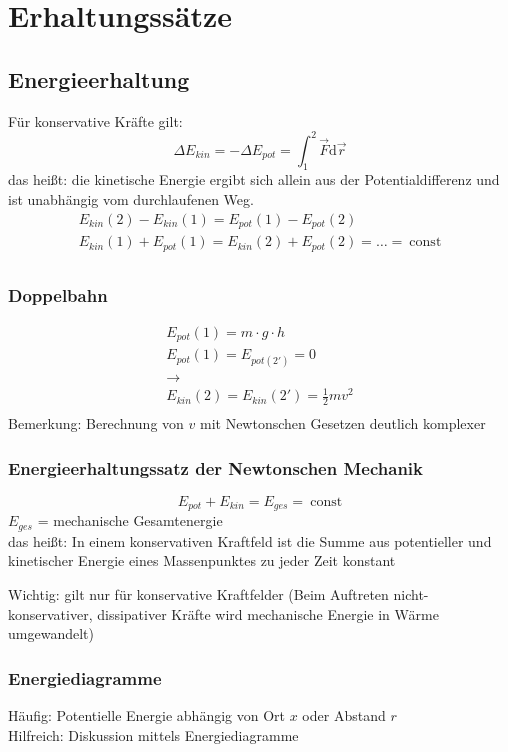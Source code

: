 \documentclass[a4paper]{scrartcl}
\renewcommand{\d}{\mathrm{d}}
\renewcommand{\v}[1]{\vec{#1}}
\theoremstyle{definition}
\theoremstyle{plain}
\theoremstyle{plain}
\theoremstyle{remark}
\theoremstyle{remark}
\theoremstyle{remark}
\begin{document}
\section{Erhaltungssätze}
\label{sec-5}
\subsection{Energieerhaltung}
\label{sec-5-1}
Für konservative Kräfte gilt:
\[\Delta E_{kin} = -\Delta E_{pot} = \int_1^2 \v F\d \v r\]
das heißt: die kinetische Energie ergibt sich allein aus der Potentialdifferenz und ist unabhängig vom durchlaufenen Weg.
\begin{align*}
E_{kin}(2) - E_{kin}(1) = E_{pot}(1) - E_{pot}(2) \\
E_{kin}(1) + E_{pot}(1) = E_{kin}(2) + E_{pot}(2) = \ldots =~\text{const} \\
\end{align*}
\subsubsection{Doppelbahn}
\label{sec-5-1-1}
\begin{align*}
E_{pot}(1) = m\cdot g\cdot h \\
E_{pot}(1) = E_{pot(2')} = 0 \\
\rightarrow \\
E_{kin}(2) = E_{kin}(2') = \frac{1}{2}m v^2 \\
\end{align*}
Bemerkung: Berechnung von $v$ mit Newtonschen Gesetzen deutlich komplexer
\subsubsection{Energieerhaltungssatz der Newtonschen Mechanik}
\label{sec-5-1-2}
\[E_{pot} + E_{kin} = E_{ges} = ~\text{const}\]
$E_{ges}$ = mechanische Gesamtenergie \\
        das heißt: In einem konservativen Kraftfeld ist die Summe aus potentieller und kinetischer Energie
eines Massenpunktes zu jeder Zeit konstant

Wichtig: gilt nur für konservative Kraftfelder (Beim Auftreten nicht-konservativer, dissipativer Kräfte wird
mechanische Energie in Wärme umgewandelt)
\subsubsection{Energiediagramme}
\label{sec-5-1-3}
Häufig: Potentielle Energie abhängig von Ort $x$ oder Abstand $r$ \\
        Hilfreich: Diskussion mittels Energiediagramme
\end{document}
